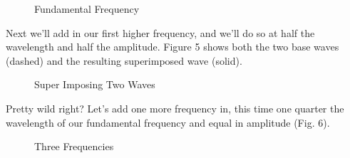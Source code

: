 \documentclass[10pt,a4paper]{article}
\begin{document}
\begin{figure}[!htb]
\caption{\label{fig:my-label} Fundamental Frequency}
\end{figure}

Next we'll add in our first higher frequency, and we'll do so at half the wavelength and half the amplitude. Figure 5 shows both the two base waves (dashed) and the resulting superimposed wave (solid).

\begin{figure}[!htb]
\caption{\label{fig:my-label} Super Imposing Two Waves}
\end{figure}

Pretty wild right? Let's add one more frequency in, this time one quarter the wavelength of our fundamental frequency and equal in amplitude (Fig. 6). 

\begin{figure}[!htb]
\caption{\label{fig:my-label} Three Frequencies}
\end{figure}
\end{document}
